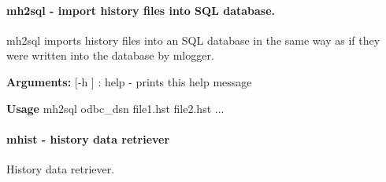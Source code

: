 \par


\par
 \hypertarget{F_History_logging_F_mh2sql_utility}{}\paragraph{mh2sql -\/ import history files into SQL database.}\label{F_History_logging_F_mh2sql_utility}
\par


mh2sql imports history files into an SQL database in the same way as if they were written into the database by mlogger.


\begin{DoxyItemize}
\item {\bfseries Arguments:} \mbox{[}-\/h \mbox{]} : help -\/ prints this help message
\end{DoxyItemize}


\begin{DoxyItemize}
\item {\bfseries  Usage } mh2sql odbc\_\-dsn file1.hst file2.hst ...
\end{DoxyItemize}

\par


\par
 \hypertarget{F_History_logging_F_mhist_utility}{}\paragraph{mhist  -\/ history data retriever}\label{F_History_logging_F_mhist_utility}
History data retriever.


